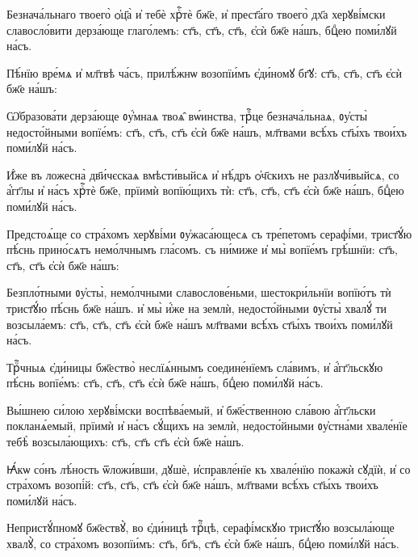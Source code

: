 \hKv Безнача́льнаго твоего̀ ѻ҆ц҃а̀ и҆ тебѐ хрⷭ҇тѐ  бж҃е, и҆ прест҃а́го твоего̀ дх҃а херꙋві́мски славосло́вити  дерза́юще глаго́лемъ: ст҃ъ, ст҃ъ, ст҃ъ, є҆сѝ бж҃е на́шъ,  бцⷣею поми́лꙋй на́съ. 
%

\hKv Пѣ́нїю вре́мѧ и҆ мл҃твѣ ча́съ, прилѣ́жнѡ возопїи́мъ  є҆ди́номꙋ бг҃ꙋ: ст҃ъ, ст҃ъ, ст҃ъ є҆сѝ бж҃е на́шъ: 
%

\hKv Ѡ҆бразова́ти дерза́юще ᲂу҆́мнаѧ твоѧ̑ вѡ́инства,  трⷪ҇це безнача́льнаѧ, ᲂу҆сты̀ недосто́йными вопїе́мъ: ст҃ъ,  ст҃ъ, ст҃ъ є҆сѝ бж҃е на́шъ, мл҃твами всѣ́хъ ст҃ы́хъ  твои́хъ поми́лꙋй на́съ. 
%

\hKv И҆́же въ ложесна̀ дв҃и́чєскаѧ вмѣсти́выйсѧ и҆  нѣ́дръ ѻ҆ч҃скихъ не   разлꙋчи́выйсѧ, со а҆́гг҃лы и҆ на́съ хрⷭ҇тѐ бж҃е, прїимѝ  вопїю́щихъ тѝ: ст҃ъ, ст҃ъ, ст҃ъ є҆сѝ бж҃е на́шъ, бцⷣею  поми́лꙋй на́съ. 
%

\hKv Предстоѧ́ще со стра́хомъ херꙋві́ми ᲂу҆жаса́ющесѧ съ  тре́петомъ серафі́ми, трист҃ꙋ́ю пѣ́снь прино́сѧтъ  немо́лчнымъ гла́сомъ. съ ни́миже и҆ мы̀ вопїе́мъ грѣ́шнїи:  ст҃ъ, ст҃ъ, ст҃ъ є҆сѝ бж҃е на́шъ: 
%

\hKv Безпло́тными ᲂу҆сты̀, немо́лчными славослове́ньми,  шестокри́льнїи вопїю́тъ тѝ трист҃ꙋ́ю пѣ́снь бж҃е на́шъ. и҆  мы̀ и҆́же на землѝ, недосто́йными ᲂу҆сты̀ хвалꙋ́ ти  возсыла́емъ: ст҃ъ, ст҃ъ, ст҃ъ є҆сѝ бж҃е на́шъ мл҃твами  всѣ́хъ ст҃ы́хъ твои́хъ поми́лꙋй на́съ. 
%

\hKv Трⷪ҇чныѧ є҆ди́ницы бж҃ество̀ неслїѧ́ннымъ  соедине́нїемъ сла́вимъ, и҆ а҆́гг҃льскꙋю пѣ́снь вопїе́мъ:  ст҃ъ, ст҃ъ, ст҃ъ є҆сѝ бж҃е на́шъ, бцⷣею поми́лꙋй на́съ.   
%

\hKv Вы́шнею си́лою херꙋві́мски воспѣва́емый, и҆ бж҃е́ственною  сла́вою а҆́гг҃льски покланѧ́емый, прїимѝ и҆ на́съ сꙋ́щихъ  на землѝ, недосто́йными ᲂу҆стна́ми хвале́нїе тебѣ̀  возсыла́ющихъ: ст҃ъ, ст҃ъ ст҃ъ є҆сѝ бж҃е на́шъ. 
%

\hKv Ꙗ҆́кѡ со́нъ лѣ́ность ѿложи́вши, дꙋшѐ,  и҆справле́нїе къ хвале́нїю покажѝ сꙋдїѝ, и҆ со стра́хомъ  возопі́й: ст҃ъ, ст҃ъ, ст҃ъ є҆сѝ бж҃е на́шъ, мл҃твами  всѣ́хъ ст҃ы́хъ твои́хъ поми́лꙋй на́съ. 
%

\hKv Непристꙋ́пномꙋ бж҃ествꙋ̀, во є҆ди́ницѣ трⷪ҇цѣ,  серафі́мскꙋю трист҃ꙋ́ю возсыла́юще хвалꙋ̀, со стра́хомъ  возопїи́мъ: ст҃ъ, бг҃ъ, ст҃ъ є҆сѝ бж҃е на́шъ, бцⷣею  поми́лꙋй на́съ. 
%

